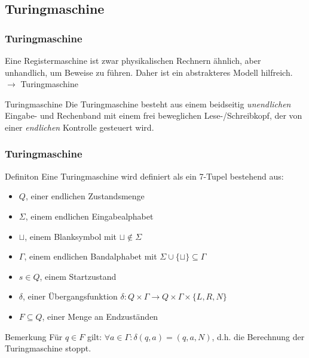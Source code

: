 \subsection{Turingmaschine}
\begin{frame}
\frametitle{Turingmaschine}
Eine Registermaschine ist zwar physikalischen Rechnern ähnlich, aber unhandlich, um Beweise zu führen.
Daher ist ein abstrakteres Modell hilfreich. \\
$\rightarrow$ Turingmaschine
\pause
\begin{block}{Turingmaschine}
Die Turingmaschine besteht aus einem beidseitig \emph{unendlichen} Eingabe- und Rechenband
mit einem frei beweglichen Lese-/Schreibkopf, der von einer \emph{endlichen} Kontrolle gesteuert wird. 
\end{block}

\begin{center}
\end{center}
\end{frame}
\begin{frame}
\frametitle{Turingmaschine}
\begin{block}{Definiton}
Eine Turingmaschine wird definiert als ein 7-Tupel bestehend aus:
 \begin{itemize}
 \item $Q$, einer endlichen Zustandsmenge
 \item $\Sigma$, einem endlichen Eingabealphabet
 \item $\sqcup$, einem Blanksymbol mit $\sqcup \notin \Sigma$
 \item $\Gamma$, einem endlichen Bandalphabet mit $\Sigma \cup\{\sqcup\} \subseteq \Gamma$
 \item $s \in Q$, einem Startzustand
 \item $\delta$, einer Übergangsfunktion $\delta: Q\times\Gamma \rightarrow Q\times\Gamma\times\{L, R, N\}$
 \item $F \subseteq Q$, einer Menge an Endzuständen
 \end{itemize}
\end{block}
\begin{block}{Bemerkung}
 Für $q\in F$ gilt: $\forall a \in \Gamma: \delta(q, a) = (q, a, N)$, d.h. die Berechnung der Turingmaschine stoppt.
\end{block}
\end{frame}

